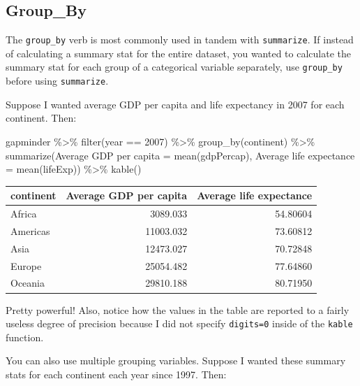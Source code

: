 \documentclass[
]{book}
\makeatletter
\newenvironment{Shaded}{\begin{snugshade}}{\end{snugshade}}
\newcommand{\DecValTok}[1]{\textcolor[rgb]{0.06,0.06,0.06}{#1}}
\newcommand{\FunctionTok}[1]{\textcolor[rgb]{0,0,0}{#1}}
\newcommand{\NormalTok}[1]{#1}
\newcommand{\OtherTok}[1]{\textcolor[rgb]{0.37,0.37,0.37}{#1}}
\newcommand{\SpecialCharTok}[1]{\textcolor[rgb]{0,0,0}{#1}}
\newcommand{\StringTok}[1]{\textcolor[rgb]{0.5,0.5,0.5}{#1}}
\newenvironment{kframe}{%
\medskip{}
\setlength{\fboxsep}{.8em}
 \def\at@end@of@kframe{}%
 \ifinner\ifhmode%
  \def\at@end@of@kframe{\end{minipage}}%
  \begin{minipage}{\columnwidth}%
 \fi\fi%
 \def\FrameCommand##1{\hskip\@totalleftmargin \hskip-\fboxsep
 \colorbox{shadecolor}{##1}\hskip-\fboxsep
     \hskip-\linewidth \hskip-\@totalleftmargin \hskip\columnwidth}%
 \MakeFramed {\advance\hsize-\width
   \@totalleftmargin\z@ \linewidth\hsize
   \@setminipage}}%
 {\par\unskip\endMakeFramed%
 \at@end@of@kframe}
\renewenvironment{Shaded}{\begin{kframe}}{\end{kframe}}
\makeatother
\begin{document}
\hypertarget{group_by}{%
\subsection{Group\_By}\label{group_by}}

The \texttt{group\_by} verb is most commonly used in tandem with \texttt{summarize}. If instead of calculating a summary stat for the entire dataset, you wanted to calculate the summary stat for each group of a categorical variable separately, use \texttt{group\_by} before using \texttt{summarize}.

Suppose I wanted average GDP per capita and life expectancy in 2007 for each continent. Then:

\begin{Shaded}
\begin{Highlighting}[]
\NormalTok{gapminder }\SpecialCharTok{\%\textgreater{}\%} 
  \FunctionTok{filter}\NormalTok{(year }\SpecialCharTok{==} \DecValTok{2007}\NormalTok{) }\SpecialCharTok{\%\textgreater{}\%} 
  \FunctionTok{group\_by}\NormalTok{(continent) }\SpecialCharTok{\%\textgreater{}\%} 
  \FunctionTok{summarize}\NormalTok{(}\StringTok{\textquotesingle{}Average GDP per capita\textquotesingle{}} \OtherTok{=} \FunctionTok{mean}\NormalTok{(gdpPercap), }
            \StringTok{\textquotesingle{}Average life expectance\textquotesingle{}} \OtherTok{=} \FunctionTok{mean}\NormalTok{(lifeExp)) }\SpecialCharTok{\%\textgreater{}\%} 
  \FunctionTok{kable}\NormalTok{()}
\end{Highlighting}
\end{Shaded}

\begin{tabular}{l|r|r}
\hline
continent & Average GDP per capita & Average life expectance\\
\hline
Africa & 3089.033 & 54.80604\\
\hline
Americas & 11003.032 & 73.60812\\
\hline
Asia & 12473.027 & 70.72848\\
\hline
Europe & 25054.482 & 77.64860\\
\hline
Oceania & 29810.188 & 80.71950\\
\hline
\end{tabular}

Pretty powerful! Also, notice how the values in the table are reported to a fairly useless degree of precision because I did not specify \texttt{digits=0} inside of the \texttt{kable} function.

You can also use multiple grouping variables. Suppose I wanted these summary stats for each continent each year since 1997. Then:
\end{document}
